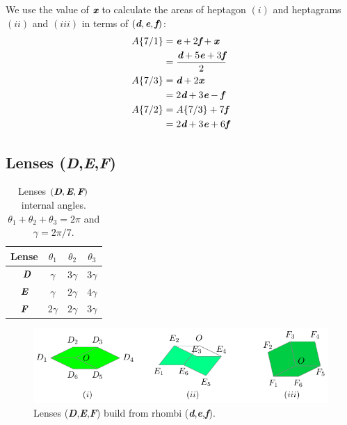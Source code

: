 \documentclass[11pt]{article}
\def\mathbi#1{\textbf{\em #1}}
\begin{document}
We use the value of $\mathbi{x}$ to calculate the areas of heptagon $(i)$ and heptagrams $(ii)$ and $(iii)$ in terms of $(\mathbi{d},\mathbi{e},\mathbi{f})$:
\begin{align}
A\{7/1\} &= \mathbi{e} + 2\mathbi{f} + \mathbi{x} \nonumber\\
    &= \frac{\mathbi{d} + 5\mathbi{e} + 3\mathbi{f}}2 \\
A\{7/3\} &= \mathbi{d} + 2\mathbi{x} \nonumber\\
 &= 2\mathbi{d} + 3\mathbi{e} - \mathbi{f} \\
A\{7/2\} &= A\{7/3\} + 7\mathbi{f} \nonumber\\
 &= 2\mathbi{d} + 3\mathbi{e} + 6\mathbi{f}
\end{align}

\subsection{Lenses (\mathbi{D},\mathbi{E},\mathbi{F})}

\begin{table}[H]
\begin{center}
\begin{tabular}{|c|c c c|} \hline
Lense & $\theta_1$ & $\theta_2$ & $\theta_3$ \\ \hline\
$\mathbi{D}$ & $\gamma$ & $3\gamma$ & $3\gamma$ \\[0.5ex] \hline
$\mathbi{E}$ & $\gamma$ & $2\gamma$ & $4\gamma$ \\[0.5ex] \hline
$\mathbi{F}$ & $2\gamma$ & $2\gamma$ & $3\gamma$ \\[0.5ex] \hline
\end{tabular}
\caption{Lenses $(\mathbi{D},\mathbi{E},\mathbi{F})$ internal angles. $\theta_1+\theta_2+\theta_3 = 2\pi$ and $\gamma = 2\pi/7$.} 
\label{tbl:def-lenses-angles}
\end{center}
\end{table}

\begin{figure}[H]
\centering
\includegraphics[scale=1.1]{def/def}
\caption{Lenses (\mathbi{D},\mathbi{E},\mathbi{F}) build from rhombi (\mathbi{d},\mathbi{e},\mathbi{f}).}
\label{fig:def-hexagons}
\end{figure}
\end{document}
